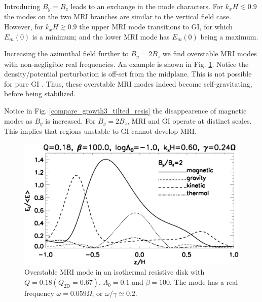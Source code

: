 Introducing $B_y = B_z$ leads to an exchange in the mode
characters. For $k_xH\lesssim 0.9$ the modes on the two MRI branches
are similar to the vertical field case. However, for $k_xH\gtrsim0.9$ 
the upper MRI mode transitions to GI, for which $E_m(0)$ is a
minimum; and the lower MRI mode has $E_m(0)$ being a maximum. 
  

Increasing the azimuthal field further to $B_y=2B_z$ we find
overstable MRI modes \citep{gammie96} with non-negligible real
frequencies. An example is shown in
Fig. \ref{result_tilted_overstable}. Notice the density/potential
perturbation is off-set from the midplane. This is not possible for
pure GI \citep{goldreich65a}. Thus, these overstable MRI modes indeed
become self-gravitating, before being stabilized. 

Notice in Fig. \ref{compare_growth3_tilted_resis} the disappearence of
magnetic modes as $B_y$ is increased. For $B_y=2B_z$, MRI and GI
operate at distinct scales. This implies that regions unstable to GI
cannot develop MRI.    




\begin{figure}
  \includegraphics[width=\linewidth,clip=true,trim=0cm 0cm 0cm
    0cm]{figures/result_tilted_resis.ps}
  \caption{Overstable MRI mode in an isothermal resistive disk with
    $Q=0.18 (Q_\mathrm{2D} = 0.67)$, $\Lambda_0=0.1$ and $\beta=100$. 
    The mode has a real frequency $\omega = 0.059\Omega$, or
    $\omega/\gamma \simeq 0.2 $.   
    \label{result_tilted_overstable}}
\end{figure}



